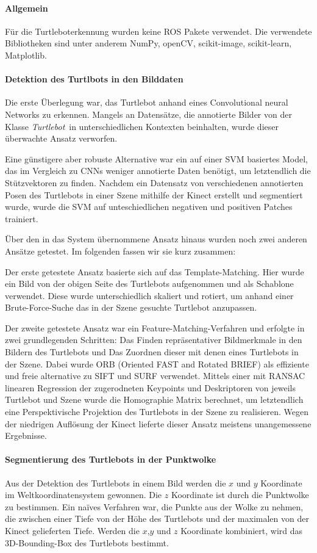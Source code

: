 \paragraph{Allgemein}
Für die Turtleboterkennung wurden keine ROS Pakete verwendet. Die verwendete Bibliotheken sind unter anderem NumPy, openCV, scikit-image, scikit-learn, Matplotlib.

\paragraph{Detektion des Turtlbots in den Bilddaten}
Die erste Überlegung war, das Turtlebot anhand eines Convolutional neural Networks zu erkennen. Mangels an Datensätze, die annotierte Bilder von der Klasse \textit{Turtlebot}\ in unterschiedlichen Kontexten beinhalten, wurde dieser überwachte Ansatz verworfen.

Eine günstigere aber robuste Alternative war ein auf einer SVM basiertes Model, das im Vergleich zu CNNs weniger annotierte Daten benötigt, um letztendlich die Stützvektoren zu finden. Nachdem ein Datensatz von verschiedenen annotierten Posen des Turtlebots in einer Szene mithilfe der Kinect erstellt und segmentiert wurde, wurde die SVM auf unteschiedlichen negativen und positiven Patches trainiert.

Über den in das System übernommene Ansatz hinaus wurden noch zwei anderen Ansätze getestet. Im folgenden fassen wir sie kurz zusammen:

Der erste getestete Ansatz basierte sich auf das Template-Matching. Hier wurde ein Bild von der obigen Seite des Turtlebots aufgenommen und als Schablone verwendet. Diese wurde unterschiedlich skaliert und rotiert, um anhand einer Brute-Force-Suche das in der Szene gesuchte Turtlebot anzupassen.

Der zweite getestete Ansatz war ein Feature-Matching-Verfahren und erfolgte in zwei grundlegenden Schritten: Das Finden repräsentativer Bildmerkmale in den Bildern des Turtlebots und Das Zuordnen dieser mit denen eines Turtlebots in der Szene. Dabei wurde ORB (Oriented FAST and Rotated BRIEF) als effiziente und freie alternative zu SIFT und SURF verwendet. Mittels einer mit RANSAC linearen Regression der zugerodneten Keypoints und Deskriptoren von jeweils Turtlebot und Szene wurde die Homographie Matrix berechnet, um letztendlich eine Perspektivische Projektion des Turtlebots in der Szene zu realisieren. Wegen der niedrigen Auflösung der Kinect lieferte dieser Ansatz meistens unangemessene Ergebnisse.

\paragraph{Segmentierung des Turtlebots in der Punktwolke}
Aus der Detektion des Turtlebots in einem Bild werden die \(x\) und \(y\) Koordinate im Weltkoordinatensystem gewonnen. Die \(z\) Koordinate ist durch die Punktwolke zu bestimmen. Ein naïves Verfahren war, die Punkte aus der Wolke zu nehmen, die zwischen einer Tiefe von der Höhe des Turtlebots und der maximalen von der Kinect gelieferten Tiefe.
Werden die \(x\),\(y\) und \(z\) Koordinate kombiniert, wird das 3D-Bounding-Box des Turtlebots bestimmt.
